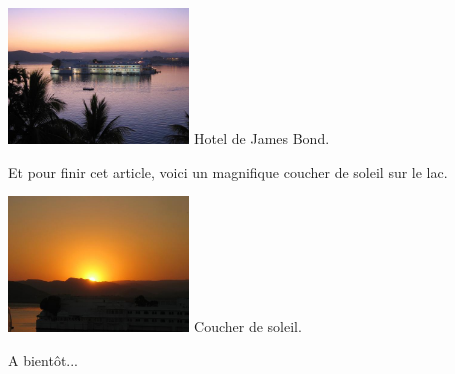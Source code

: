 \begin{multicols}{2}
\hspace*{-0.65cm}
\includegraphics[width=4.8cm]{articles/Octopussy/octopussy.jpg}
Hotel de James Bond.

Et pour finir cet article, voici un magnifique coucher de soleil sur le lac.

\hspace*{-0.65cm}
\includegraphics[width=4.8cm]{articles/Octopussy/soleil.jpg}
Coucher de soleil.

A bientôt...

\end{multicols}


